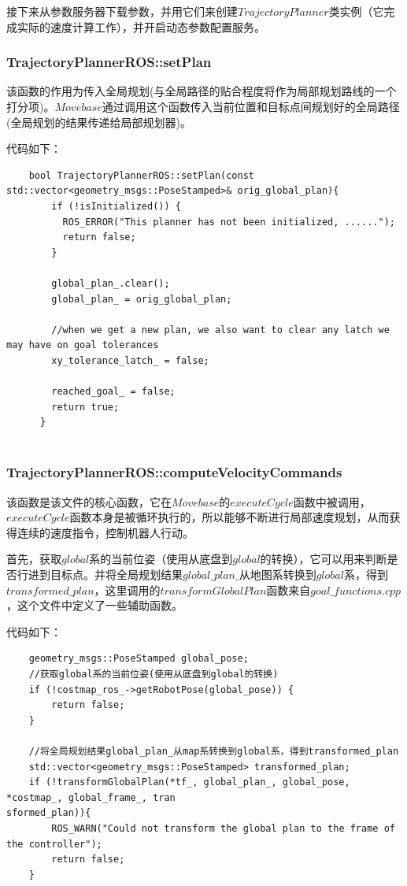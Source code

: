 \documentclass[9pt, oneside]{book}
\begin{document}
接下来从参数服务器下载参数，并用它们来创建$TrajectoryPlanner$类实例（它完成实际的速度计算工作），并开启动态参数配置服务。

\subsubsection{TrajectoryPlannerROS::setPlan}

该函数的作用为传入全局规划(与全局路径的贴合程度将作为局部规划路线的一个打分项)。$Movebase$通过调用这个函数传入当前位置和目标点间规划好的全局路径(全局规划的结果传递给局部规划器)。

代码如下：

\footnotesize
\begin{verbatim}
    bool TrajectoryPlannerROS::setPlan(const std::vector<geometry_msgs::PoseStamped>& orig_global_plan){
        if (!isInitialized()) {
          ROS_ERROR("This planner has not been initialized, ......");
          return false;
        }
    
        global_plan_.clear();
        global_plan_ = orig_global_plan;
        
        //when we get a new plan, we also want to clear any latch we may have on goal tolerances
        xy_tolerance_latch_ = false;
    
        reached_goal_ = false;
        return true;
      }
    
\end{verbatim}
\normalsize

\subsubsection{TrajectoryPlannerROS::computeVelocityCommands}

该函数是该文件的核心函数，它在$Movebase$的$executeCycle$函数中被调用，$executeCycle$函数本身是被循环执行的，所以能够不断进行局部速度规划，从而获得连续的速度指令，控制机器人行动。

首先，获取$global$系的当前位姿（使用从底盘到$global$的转换），它可以用来判断是否行进到目标点。并将全局规划结果$global\_plan\_$从地图系转换到$global$系，得到$transformed\_plan$，这里调用的$transformGlobalPlan$函数来自$goal\_functions.cpp$，这个文件中定义了一些辅助函数。

代码如下：

\small
\begin{verbatim}
    geometry_msgs::PoseStamped global_pose;
    //获取global系的当前位姿(使用从底盘到global的转换)
    if (!costmap_ros_->getRobotPose(global_pose)) {
        return false;
    }

    //将全局规划结果global_plan_从map系转换到global系，得到transformed_plan
    std::vector<geometry_msgs::PoseStamped> transformed_plan;
    if (!transformGlobalPlan(*tf_, global_plan_, global_pose, *costmap_, global_frame_, tran
sformed_plan)){
        ROS_WARN("Could not transform the global plan to the frame of the controller");
        return false;
    }
\end{verbatim}
\normalsize
\end{document}
